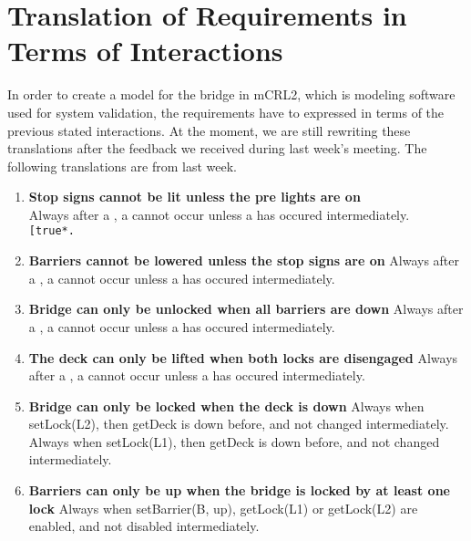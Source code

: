 \section{Translation of Requirements in Terms of Interactions}

In order to create a model for the bridge in mCRL2, which is modeling software used for system validation, the requirements have to expressed in terms of the previous stated interactions. At the moment, we are still rewriting these translations after the feedback we received during last week's meeting. The following translations are from last week.

\begin{enumerate}
	\item \textbf{Stop signs cannot be lit unless the pre lights are on}\\
	Always after a , a  cannot occur unless a 
	 has occured intermediately.\\
	\texttt{[true*.}

	\item \textbf{Barriers cannot be lowered unless the stop signs are on}
	Always after a , a  cannot occur unless a  has occured intermediately.

	\item \textbf{Bridge can only be unlocked when all barriers are down}
	Always after a , a  cannot occur unless a  has occured intermediately.

	\item	\textbf{The deck can only be lifted when both locks are disengaged}
	Always after a , a  cannot occur unless a  has occured intermediately.

	\item \textbf{Bridge can only be locked when the deck is down}
	Always when setLock(L2), then getDeck is down before, and not changed intermediately.
	Always when setLock(L1), then getDeck is down before, and not changed intermediately.

	\item \textbf{Barriers can only be up when the bridge is locked by at least one lock}
	Always when setBarrier(B, up), getLock(L1) or getLock(L2) are enabled, and not disabled intermediately.


\end{enumerate}
